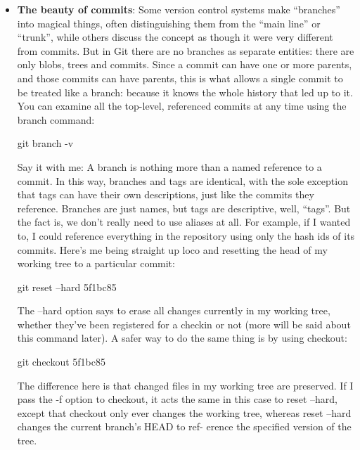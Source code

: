 \documentclass{report}
\begin{document}
    \pagebreak 
    \begin{itemize}
        \item \textbf{The beauty of commits}: Some version control systems make “branches” into magical things, often distinguishing them from the “main line” or “trunk”, while others discuss the concept as though it were very different from commits. But in Git there are no branches as separate entities: there are only blobs, trees and commits. Since a commit can have one or more parents, and those commits can have parents, this is what allows a single commit to be treated like a branch: because it knows the whole history that led up to it.
            \bigbreak \noindent 
            You can examine all the top-level, referenced commits at any time using the branch command:
            \bigbreak \noindent 
            \begin{bashcode}
                git branch -v
            \end{bashcode}
            \bigbreak \noindent 
            Say it with me: A branch is nothing more than a named reference to a commit. In this way, branches and tags are identical, with the sole exception that tags can have their own descriptions, just like the commits they reference. Branches are just names, but tags are descriptive, well, “tags”.
            \bigbreak \noindent 
            But the fact is, we don’t really need to use aliases at all. For example, if I wanted to, I could reference everything in the repository using only the hash ids of its commits. Here’s me being straight up loco and resetting the head of my working tree to a particular commit:
            \bigbreak \noindent 
            \begin{bashcode}
                git reset --hard 5f1bc85
            \end{bashcode}
            \bigbreak \noindent 
            The --hard option says to erase all changes currently in my working tree, whether they’ve been registered for a checkin or not (more will be said about this command later). A safer way to do the same thing is by using checkout:
            \bigbreak \noindent 
            \begin{bashcode}
                git checkout 5f1bc85
            \end{bashcode}
            \bigbreak \noindent 
            The difference here is that changed files in my working tree are preserved. If I pass the -f option to checkout, it acts the same in this case to reset --hard, except that checkout only ever changes the working tree, whereas reset --hard changes the current branch's HEAD to ref- erence the specified version of the tree.

\end{itemize}
\end{document}
